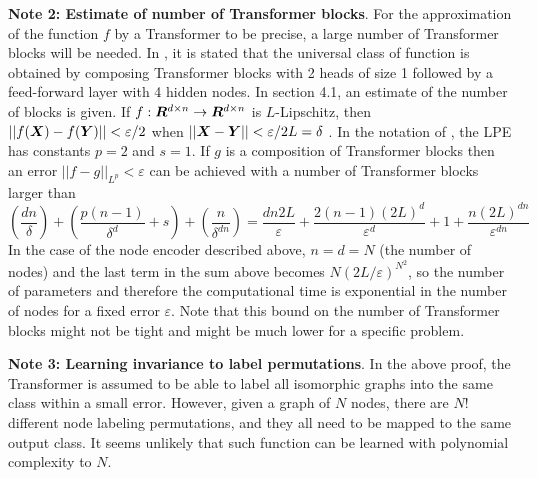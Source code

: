 \documentclass{article}
\newcommand{\xhdr}[1]{{\noindent\bfseries #1}.}
\begin{document}

\xhdr{Note 2: Estimate of number of Transformer blocks} For the approximation of the function $f$ by a Transformer to be precise, a large number of Transformer blocks will be needed. In \cite{yun2020transformers}, it is stated that the universal class of function is obtained by composing Transformer blocks with 2 heads of size 1 followed by a feed-forward layer with 4 hidden nodes. In  \cite{yun2020sparsetransformers} section 4.1, an estimate of the number of blocks is given. If $f:{\bm{R}}^{d\times n} \to {\bm{R}}^{d\times n}$ is $L$-Lipschitz, then $||f({\bm{X}}) - f({\bm{Y}})||< \varepsilon/2$ when  $||{\bm{X}} - {\bm{Y}}|| < \varepsilon/2L = \delta $ . In the notation of \cite{yun2020sparsetransformers}, the LPE has constants $p=2$ and $s=1$. If $g$ is a composition of Transformer blocks then an error $||f-g||_{L^p}< \varepsilon $  can be achieved with a number of Transformer blocks larger than
\[
\left(\frac{dn}{\delta} \right) + 
\left( \frac{p(n-1)}{\delta^d} + s\right) + 
\left( \frac{n}{\delta^{dn}} \right) = \frac{dn2L}{\varepsilon}+ \frac{2(n-1)(2L)^d}{\varepsilon^d} + 1 + \frac{n(2L)^{dn}}{\varepsilon^{dn}}
\]
In the case of the node encoder described above, $n =d= N$ (the number of nodes) and the last term in the sum above becomes $N(2L/\varepsilon)^{N^2}$, so the number of parameters and therefore the computational time is exponential in the number of nodes for a fixed error $\varepsilon$. Note that this bound on the number of Transformer blocks might not be tight and might be much lower for a specific problem.


\xhdr{Note 3: Learning invariance to label permutations}
In the above proof, the Transformer is assumed to be able to label all isomorphic graphs into the same class within a small error. However, given a graph of $N$ nodes, there are $N!$ different node labeling permutations, and they all need to be mapped to the same output class. It seems unlikely that such function can be learned with polynomial complexity to $N$.
\end{document}
